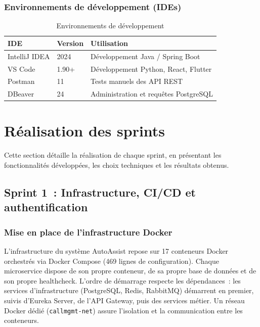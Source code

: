 \subsubsection{Environnements de d\'{e}veloppement (IDEs)}

\begin{table}[H]
\centering
\caption{Environnements de d\'{e}veloppement}
\label{tab:ides}
\begin{tabular}{|p{3.5cm}|p{2cm}|p{7.5cm}|}
\hline
\textbf{IDE} & \textbf{Version} & \textbf{Utilisation} \\
\hline
IntelliJ IDEA & 2024 & D\'{e}veloppement Java / Spring Boot \\
\hline
VS Code & 1.90+ & D\'{e}veloppement Python, React, Flutter \\
\hline
Postman & 11 & Tests manuels des API REST \\
\hline
DBeaver & 24 & Administration et requ\^{e}tes PostgreSQL \\
\hline
\end{tabular}
\end{table}


\section{R\'{e}alisation des sprints}
\label{sec:sprints}

Cette section d\'{e}taille la r\'{e}alisation de chaque sprint, en pr\'{e}sentant les fonctionnalit\'{e}s d\'{e}velopp\'{e}es, les choix techniques et les r\'{e}sultats obtenus.

\subsection{Sprint 1~: Infrastructure, CI/CD et authentification}

\subsubsection{Mise en place de l'infrastructure Docker}

L'infrastructure du syst\`{e}me AutoAssist repose sur 17 conteneurs Docker orchestr\'{e}s via Docker Compose (469 lignes de configuration). Chaque microservice dispose de son propre conteneur, de sa propre base de donn\'{e}es et de son propre healthcheck. L'ordre de d\'{e}marrage respecte les d\'{e}pendances~: les services d'infrastructure (PostgreSQL, Redis, RabbitMQ) d\'{e}marrent en premier, suivis d'Eureka Server, de l'API Gateway, puis des services m\'{e}tier. Un r\'{e}seau Docker d\'{e}di\'{e} (\texttt{callmgmt-net}) assure l'isolation et la communication entre les conteneurs.

